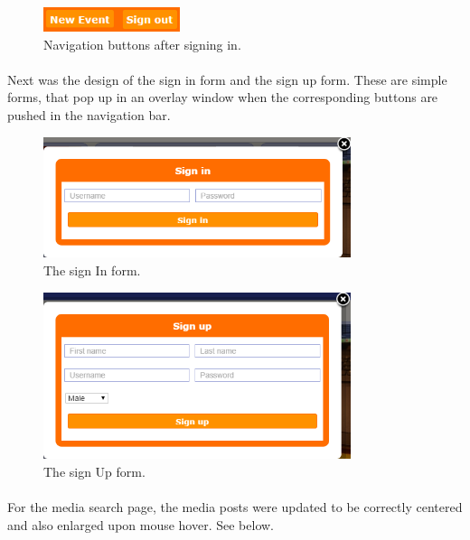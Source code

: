 \begin{figure}[ht!]
\centering
\includegraphics[width=40mm]{Sprint2/img/Sprint2-buttons2.png}
\caption{Navigation buttons after signing in. \label{overflow}}
\end{figure}

\paragraph{}
Next was the design of the sign in form and the sign up form. These are simple forms, that pop up in an overlay window when the corresponding buttons are pushed in the navigation bar. \\

\begin{figure}[ht!]
\centering
\includegraphics[width=90mm]{Sprint2/img/Sprint2-SignInForm.png}
\caption{The sign In form. \label{overflow}}
\end{figure}

\begin{figure}[ht!]
\centering
\includegraphics[width=90mm]{Sprint2/img/Sprint2-SignUpForm.png}
\caption{The sign Up form. \label{overflow}}
\end{figure}

\paragraph{} For the media search page, the media posts were updated to be correctly centered and also enlarged upon mouse hover. See below. 

